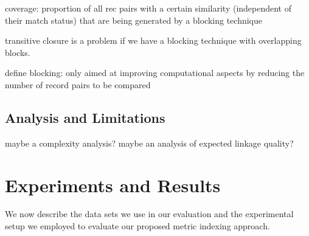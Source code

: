 \documentclass{llncs}
\begin{document}
coverage: proportion of all rec pairs with a certain similarity
(independent of their match status) that are being generated by
a blocking  technique

transitive closure is a problem if we have a blocking technique with overlapping blocks.

define blocking: only aimed at improving computational aspects by reducing the number of record pairs to be compared










\subsection{Analysis and Limitations}
\label{sec-analysis}

maybe a complexity analysis? maybe an analysis of expected 
linkage quality?


\section{Experiments and Results}
\label{sec-data}

We now describe the data sets we use in our evaluation and the
experimental setup we employed to evaluate our proposed metric
indexing approach.


\end{document}
